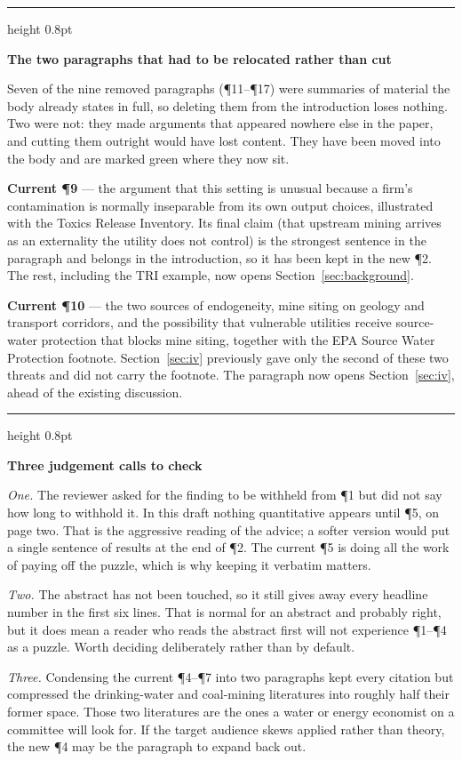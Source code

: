 \documentclass[12pt]{article}
\newenvironment{editnote}[1]{%
  \par\medskip\noindent
  \begin{minipage}{\linewidth}%
  {\color{boxrule}\hrule height 0.8pt}\smallskip
  {\sffamily\bfseries\small #1\par}\smallskip
  \small\singlespacing\raggedright
  \setlength{\parindent}{0pt}\setlength{\parskip}{0.5em}\ignorespaces
}{%
  \par\smallskip{\color{boxrule}\hrule height 0.8pt}%
  \end{minipage}\par\medskip
}
\begin{document}
\begin{editnote}{The two paragraphs that had to be relocated rather than cut}
Seven of the nine removed paragraphs (\P11--\P17) were summaries of material the body
already states in full, so deleting them from the introduction loses nothing. Two were
not: they made arguments that appeared nowhere else in the paper, and cutting them
outright would have lost content. They have been moved into the body and are marked
{\sffamily\color{movedcol}green} where they now sit.

\smallskip
\textbf{Current \P9} --- the argument that this setting is unusual because a firm's
contamination is normally inseparable from its own output choices, illustrated with the
Toxics Release Inventory. Its final claim (that upstream mining arrives as an externality
the utility does not control) is the strongest sentence in the paragraph and belongs in
the introduction, so it has been kept in the new \P2. The rest, including the TRI
example, now opens Section~\ref{sec:background}.

\smallskip
\textbf{Current \P10} --- the two sources of endogeneity, mine siting on geology and
transport corridors, and the possibility that vulnerable utilities receive source-water
protection that blocks mine siting, together with the EPA Source Water Protection
footnote. Section~\ref{sec:iv} previously gave only the second of these two threats and
did not carry the footnote. The paragraph now opens Section~\ref{sec:iv}, ahead of the
existing discussion.
\end{editnote}

\begin{editnote}{Three judgement calls to check}
\emph{One.} The reviewer asked for the finding to be withheld from \P1 but did not say
how long to withhold it. In this draft nothing quantitative appears until \P5, on page
two. That is the aggressive reading of the advice; a softer version would put a single
sentence of results at the end of \P2. The current \P5 is doing all the work of paying
off the puzzle, which is why keeping it verbatim matters.

\emph{Two.} The abstract has not been touched, so it still gives away every headline
number in the first six lines. That is normal for an abstract and probably right, but it
does mean a reader who reads the abstract first will not experience \P1--\P4 as a puzzle.
Worth deciding deliberately rather than by default.

\emph{Three.} Condensing the current \P4--\P7 into two paragraphs kept every citation but
compressed the drinking-water and coal-mining literatures into roughly half their former
space. Those two literatures are the ones a water or energy economist on a committee will
look for. If the target audience skews applied rather than theory, the new \P4 may be the
paragraph to expand back out.
\end{editnote}
\end{document}
